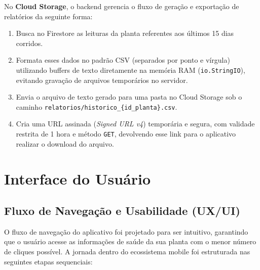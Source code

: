 \documentclass[
	12pt,
	article,
	oneside,
	a4paper,
	english,
	brazil
	]{abntex2}
\begin{document}
No \textbf{Cloud Storage}, o backend gerencia o fluxo de geração e exportação de relatórios da seguinte forma:
\begin{enumerate}
    \item Busca no Firestore as leituras da planta referentes aos últimos 15 dias corridos.
    \item Formata esses dados no padrão CSV (separados por ponto e vírgula) utilizando buffers de texto diretamente na memória RAM (\texttt{io.StringIO}), evitando gravação de arquivos temporários no servidor.
    \item Envia o arquivo de texto gerado para uma pasta no Cloud Storage sob o caminho \texttt{relatorios/historico\_\{id\_planta\}.csv}.
    \item Cria uma URL assinada (\textit{Signed URL v4}) temporária e segura, com validade restrita de 1 hora e método \texttt{GET}, devolvendo esse link para o aplicativo realizar o download do arquivo.
\end{enumerate}

\section{Interface do Usuário}

\subsection{Fluxo de Navegação e Usabilidade (UX/UI)}
O fluxo de navegação do aplicativo foi projetado para ser intuitivo, garantindo que o usuário acesse as informações de saúde da sua planta com o menor número de cliques possível. A jornada dentro do ecossistema mobile foi estruturada nas seguintes etapas sequenciais:
\end{document}
